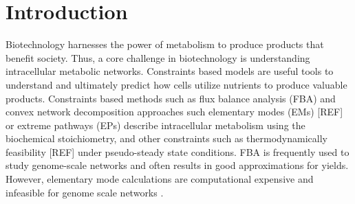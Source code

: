 \documentclass[10pt,twocolumn,twoside,final]{IEEEtran}
\begin{document}
\section{Introduction}

Biotechnology harnesses the power of metabolism to produce products that benefit society.
Thus, a core challenge in biotechnology is understanding intracellular metabolic networks.
Constraints based models are useful tools to understand and ultimately predict how cells utilize nutrients to produce valuable products.
Constraints based methods such as flux balance analysis (FBA) \cite{2010_orth_NatBiotech} and convex network decomposition approaches such elementary modes (EMs) [REF]
or extreme pathways (EPs) \cite{Schilling:2000aa}
describe intracellular metabolism using the biochemical stoichiometry, and other constraints such as thermodynamically feasibility [REF] under pseudo-steady state conditions.
FBA is frequently used to study genome-scale networks and often results in good approximations for yields.
However, elementary mode calculations are computational expensive and infeasible for genome scale networks \cite{2004_lee_varner_ko_ieee}.
\end{document}
